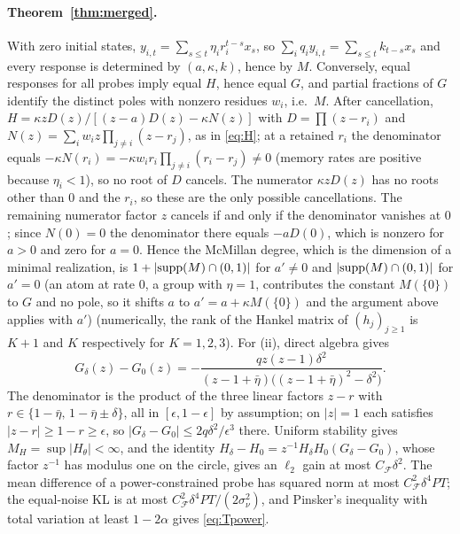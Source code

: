 \documentclass[12pt]{article}
\theoremstyle{definition}
\theoremstyle{remark}
\begin{document}
\paragraph{Theorem~\ref{thm:merged}.} With zero initial states, $y_{i,t}=\sum_{s\le t}\eta_ir_i^{t-s}x_s$, so $\sum_iq_iy_{i,t}=\sum_{s\le t}k_{t-s}x_s$ and every response is determined by $(a,\kappa,k)$, hence by $M$. Conversely, equal responses for all probes imply equal $H$, hence equal $G$, and partial fractions of $G$ identify the distinct poles with nonzero residues $w_i$, i.e.\ $M$. After cancellation, $H=\kappa zD(z)/[(z-a)D(z)-\kappa N(z)]$ with $D=\prod(z-r_i)$ and $N(z)=\sum_iw_iz\prod_{j\ne i}(z-r_j)$, as in \eqref{eq:H}; at a retained $r_i$ the denominator equals $-\kappa N(r_i)=-\kappa w_ir_i\prod_{j\ne i}(r_i-r_j)\neq0$ (memory rates are positive because $\eta_i<1$), so no root of $D$ cancels. The numerator $\kappa zD(z)$ has no roots other than $0$ and the $r_i$, so these are the only possible cancellations. The remaining numerator factor $z$ cancels if and only if the denominator vanishes at $0$; since $N(0)=0$ the denominator there equals $-aD(0)$, which is nonzero for $a>0$ and zero for $a=0$. Hence the McMillan degree, which is the dimension of a minimal realization, is $1+|{\rm supp}(M)\cap(0,1)|$ for $a'\neq0$ and $|{\rm supp}(M)\cap(0,1)|$ for $a'=0$ (an atom at rate $0$, a group with $\eta=1$, contributes the constant $M(\{0\})$ to $G$ and no pole, so it shifts $a$ to $a'=a+\kappa M(\{0\})$ and the argument above applies with $a'$) (numerically, the rank of the Hankel matrix of $(h_j)_{j\ge1}$ is $K+1$ and $K$ respectively for $K=1,2,3$). For (ii), direct algebra gives
\[
G_\delta(z)-G_0(z)=-\frac{qz(z-1)\delta^2}{(z-1+\bar\eta)\bigl((z-1+\bar\eta)^2-\delta^2\bigr)} .
\]
The denominator is the product of the three linear factors $z-r$ with $r\in\{1-\bar\eta,\,1-\bar\eta\pm\delta\}$, all in $[\epsilon,1-\epsilon]$ by assumption; on $|z|=1$ each satisfies $|z-r|\ge1-r\ge\epsilon$, so $|G_\delta-G_0|\le2q\delta^2/\epsilon^3$ there. Uniform stability gives $M_H=\sup|H_\theta|<\infty$, and the identity $H_\delta-H_0=z^{-1}H_\delta H_0(G_\delta-G_0)$, whose factor $z^{-1}$ has modulus one on the circle, gives an $\ell_2$ gain at most $C_{\mathcal F}\delta^2$. The mean difference of a power-constrained probe has squared norm at most $C_{\mathcal F}^2\delta^4PT$; the equal-noise KL is at most $C_{\mathcal F}^2\delta^4PT/(2\sigma_\nu^2)$, and Pinsker's inequality with total variation at least $1-2\alpha$ gives \eqref{eq:Tpower}.
\end{document}

